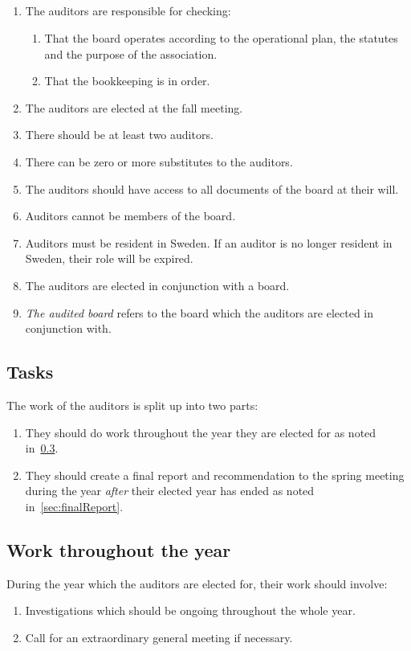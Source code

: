 \subsection{}
\begin{enumerate}
  \item The auditors are responsible for checking: 
  \begin{enumerate}
    \item That the board operates according to the operational plan, the statutes and the purpose of the association.
    \item That the bookkeeping is in order.
  \end{enumerate}
  \item The auditors are elected at the fall meeting. 
  \item There should be at least two auditors. 
  \item There can be zero or more substitutes to the auditors.
  \item The auditors should have access to all documents of the board at their will.
  \item Auditors cannot be members of the board. 
  \item Auditors must be resident in Sweden. If an auditor is no longer resident in Sweden, their role will be expired.
  \item The auditors are elected in conjunction with a board.
  \item \textit{The audited board} refers to the board which the auditors are elected in conjunction with.
\end{enumerate}

\subsection{Tasks}
The work of the auditors is split up into two parts:
\begin{enumerate}
  \item They should do work throughout the year they are elected for as noted in~\ref{sec:auditorYear}.
  \item They should create a final report and recommendation to the spring meeting during the year \textit{after} their elected year has ended as noted in~\ref{sec:finalReport}.
\end{enumerate}

\subsection{Work throughout the year} \label{sec:auditorYear}
During the year which the auditors are elected for, their work should involve:
\begin{enumerate}
  \item Investigations which should be ongoing throughout the whole year.
  \item Call for an extraordinary general meeting if necessary.
\end{enumerate}

